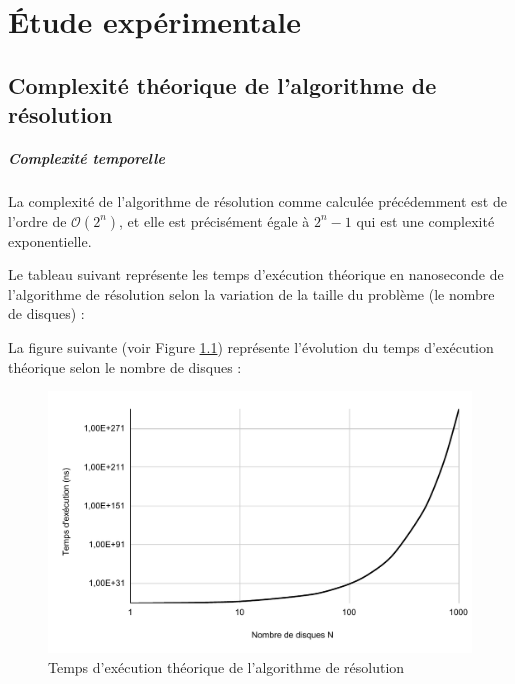 \chapter{Étude expérimentale}

\section{Complexité théorique de l'algorithme de résolution}
\paragraph{Complexité temporelle}
La complexité de l'algorithme de résolution comme calculée précédemment est de l'ordre de $\mathcal{O}(2^{n})$, et elle est précisément égale à $2^{n} - 1$ qui est une complexité exponentielle.
\par
Le tableau suivant représente les temps d'exécution théorique en nanoseconde de l'algorithme de résolution selon la variation de la taille du problème (le nombre de disques) :

\small
\begin{center}
\end{center}

La figure suivante (voir Figure \ref{fig:temps_exec_th_algo_reso}) représente l'évolution du temps d'exécution théorique selon le nombre de disques :

\begin{figure}[H]
    \centering
        \includegraphics[scale=0.6]{./ressources/temps_execution_th_algo_reso.pdf}
        \caption{Temps d'exécution théorique de l'algorithme de résolution}
    \label{fig:temps_exec_th_algo_reso}
\end{figure} 

